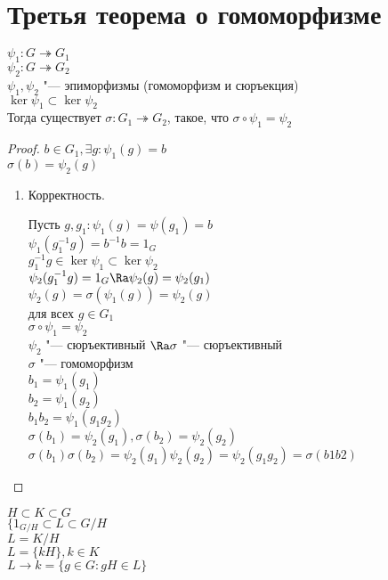 ﻿\section{Третья теорема о гомоморфизме}
\begin{theorem}
$\psi_1 \colon G \twoheadrightarrow G_1$ \\
$\psi_2 \colon G \twoheadrightarrow G_2$ \\
$\psi_1, \psi_2$ "--- эпиморфизмы (гомоморфизм и сюръекция)\\
$\ker \psi_1 \subset \ker \psi_2$\\
Тогда существует $\sigma \colon G_1 \twoheadrightarrow G_2$, такое, что $\sigma \circ \psi_1 = \psi_2$\\
\end{theorem}
\begin{proof}
$b \in G_1, \exists g \colon \psi_1(g) = b$\\
$\sigma (b) = \psi_2(g)$\\

\begin{enumerate}
\item Корректность.

Пусть $g, g_1 \colon \psi_1(g) = \psi(g_1) = b$\\
$\psi_1(g_1^{-1}g) = b^{-1}b = 1_G$\\
$g_1^{-1}g \in \ker \psi_1 \subset \ker \psi_2$\\
$\psi_2(g_1^{-1}g) = 1_G \Ra \psi_2(g) = \psi_2(g_1)$\\

$\psi_2(g) = \sigma(\psi_1(g)) = \psi_2(g)$\\
для всех $g \in G_1$\\
$\sigma \circ \psi_1 = \psi_2$\\
$\psi_2$ "--- сюръективный $\Ra \sigma$ "--- сюръективный\\

$\sigma$ "--- гомоморфизм\\
$b_1 = \psi_1(g_1)$\\
$b_2 = \psi_1(g_2)$\\
$b_1b_2 = \psi_1(g_1g_2)$\\

$\sigma(b_1) = \psi_2(g_1), \sigma(b_2) = \psi_2(g_2)$\\
$\sigma(b_1)\sigma(b_2) = \psi_2(g_1) \psi_2(g_2) = \psi_2(g_1g_2) = \sigma(b1b2)$\\
\end{enumerate}
\end{proof}
\begin{Rem}
$H\subset K \subset G$\\
$\{1_{G/H}\subset L \subset G / H$ \\
$L = K /H$\\
$L = \{kH\}, k \in K$\\
$L \to k = \{g \in G \colon gH \in L\}$\\
\end{Rem}

